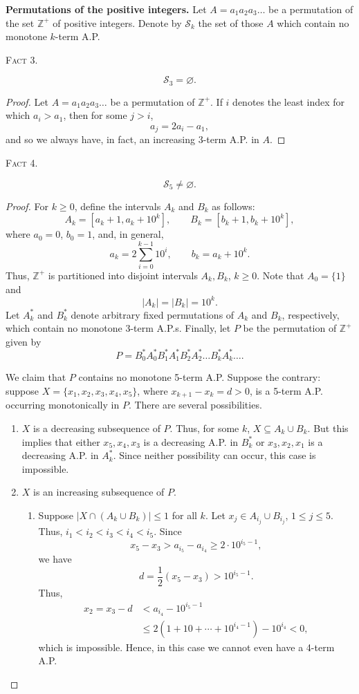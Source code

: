 \documentclass[10pt]{article}
\newcommand{\Zpos}{\mathbb{Z}^{+}}
\newcommand{\Scal}{\mathscr{S}}
\newcommand{\fact}[1]{\par\medskip\noindent\textsc{Fact #1.}\par\smallskip}
\begin{document}
\medskip
\noindent\textbf{Permutations of the positive integers.}
Let $A=a_1a_2a_3\ldots$ be a permutation of the set $\Zpos$ of positive
integers. Denote by $\Scal_k$ the set of those $A$ which contain no
monotone $k$-term A.P.

\fact{3}
\[
 \Scal_3=\varnothing.
\]

\begin{proof}
Let $A=a_1a_2a_3\ldots$ be a permutation of $\Zpos$. If $i$ denotes the
least index for which $a_i>a_1$, then for some $j>i$,
\[
 a_j=2a_i-a_1,
\]
and so we always have, in fact, an increasing 3-term A.P. in $A$.
\end{proof}

\fact{4}
\[
 \Scal_5\ne\varnothing.
\]

\begin{proof}
For $k\ge0$, define the intervals $A_k$ and $B_k$ as follows:
\[
 A_k=[a_k+1,a_k+10^k],
 \qquad
 B_k=[b_k+1,b_k+10^k],
\]
where $a_0=0$, $b_0=1$, and, in general,
\[
 a_k=2\sum_{i=0}^{k-1}10^i,
 \qquad
 b_k=a_k+10^k.
\]
Thus, $\Zpos$ is partitioned into disjoint intervals $A_k,B_k$, $k\ge0$.
Note that $A_0=\{1\}$ and
\[
 |A_k|=|B_k|=10^k.
\]
Let $A_k^*$ and $B_k^*$ denote arbitrary fixed permutations of $A_k$ and
$B_k$, respectively, which contain no monotone 3-term A.P.s. Finally,
let $P$ be the permutation of $\Zpos$ given by
\[
 P=B_0^*A_0^*B_1^*A_1^*B_2^*A_2^*\ldots B_k^*A_k^*\ldots.
\]

We claim that $P$ contains no monotone 5-term A.P. Suppose the contrary:
suppose $X=\{x_1,x_2,x_3,x_4,x_5\}$, where
$x_{k+1}-x_k=d>0$, is a 5-term A.P. occurring monotonically in $P$.
There are several possibilities.

\begin{enumerate}[label=(\roman*),leftmargin=2.3em]
\item $X$ is a decreasing subsequence of $P$. Thus, for some $k$,
$X\subseteq A_k\cup B_k$. But this implies that either $x_5,x_4,x_3$ is
a decreasing A.P. in $B_k^*$ or $x_3,x_2,x_1$ is a decreasing A.P. in
$A_k^*$. Since neither possibility can occur, this case is impossible.

\item $X$ is an increasing subsequence of $P$.

\begin{enumerate}[label=(\alph*),leftmargin=2.3em]
\item Suppose $|X\cap(A_k\cup B_k)|\le1$ for all $k$. Let
$x_j\in A_{i_j}\cup B_{i_j}$, $1\le j\le5$. Thus,
$i_1<i_2<i_3<i_4<i_5$. Since
\[
 x_5-x_3>a_{i_5}-a_{i_4}\ge2\cdot10^{i_5-1},
\]
we have
\[
 d=\frac12(x_5-x_3)>10^{i_5-1}.
\]
Thus,
\[
 \begin{aligned}
 x_2=x_3-d
 &<a_{i_4}-10^{i_5-1}\\
 &\le 2(1+10+\cdots+10^{i_4-1})-10^{i_4}<0,
 \end{aligned}
\]
which is impossible. Hence, in this case we cannot even have a 4-term
A.P.


\end{enumerate}
\end{enumerate}
\end{proof}
\end{document}
